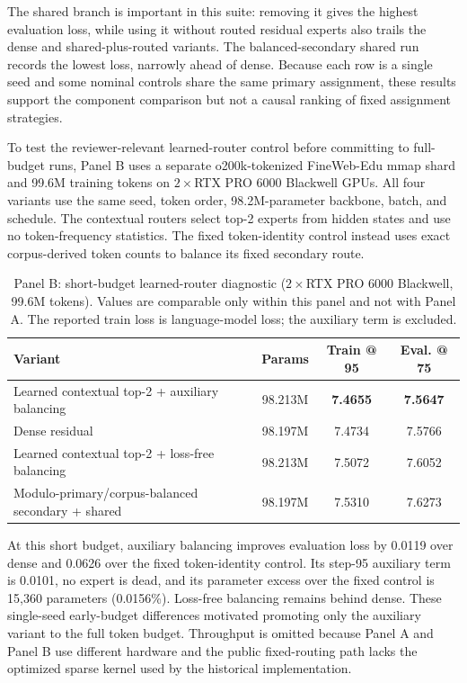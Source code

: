 \documentclass[10pt]{article}
\theoremstyle{definition}
\theoremstyle{remark}
\begin{document}
The shared branch is important in this suite: removing it gives the highest evaluation loss, while using it without routed residual experts also trails the dense and shared-plus-routed variants. The balanced-secondary shared run records the lowest loss, narrowly ahead of dense. Because each row is a single seed and some nominal controls share the same primary assignment, these results support the component comparison but not a causal ranking of fixed assignment strategies.

To test the reviewer-relevant learned-router control before committing to full-budget runs, Panel B uses a separate o200k-tokenized FineWeb-Edu mmap shard and 99.6M training tokens on $2\times$RTX PRO 6000 Blackwell GPUs. All four variants use the same seed, token order, 98.2M-parameter backbone, batch, and schedule. The contextual routers select top-2 experts from hidden states and use no token-frequency statistics. The fixed token-identity control instead uses exact corpus-derived token counts to balance its fixed secondary route.

\begin{table}[H]
\centering
\small
\caption{Panel B: short-budget learned-router diagnostic ($2\times$RTX PRO 6000 Blackwell, 99.6M tokens). Values are comparable only within this panel and not with Panel A. The reported train loss is language-model loss; the auxiliary term is excluded.}
\label{tab:100m_router_short}
\begin{tabular}{lccc}
\toprule
\textbf{Variant} & \textbf{Params} & \textbf{Train @ 95} & \textbf{Eval. @ 75} \\
\midrule
Learned contextual top-2 + auxiliary balancing & 98.213M & \textbf{7.4655} & \textbf{7.5647} \\
Dense residual & 98.197M & 7.4734 & 7.5766 \\
Learned contextual top-2 + loss-free balancing & 98.213M & 7.5072 & 7.6052 \\
Modulo-primary/corpus-balanced secondary + shared & 98.197M & 7.5310 & 7.6273 \\
\bottomrule
\end{tabular}
\end{table}

At this short budget, auxiliary balancing improves evaluation loss by 0.0119 over dense and 0.0626 over the fixed token-identity control. Its step-95 auxiliary term is 0.0101, no expert is dead, and its parameter excess over the fixed control is 15,360 parameters (0.0156\%). Loss-free balancing remains behind dense. These single-seed early-budget differences motivated promoting only the auxiliary variant to the full token budget. Throughput is omitted because Panel A and Panel B use different hardware and the public fixed-routing path lacks the optimized sparse kernel used by the historical implementation.
\end{document}

